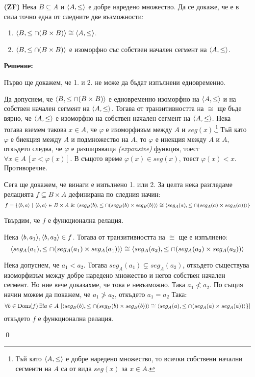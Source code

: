 \begin{problem}
\textbf{(ZF)}
Нека $B \subseteq A$ и $\langle A, \leq \rangle$ е добре наредено множество.
Да се докаже, че е в сила точно една от следните две възможности:
\begin{enumerate}
\item
$\langle B, \leq \cap (B \times B) \rangle \cong \langle A, \leq \rangle$.

\item
$\langle B, \leq \cap (B \times B) \rangle$ е изоморфно със собствен начален сегмент на $\langle A, \leq \rangle$.
\end{enumerate}
\end{problem}

\textbf{Решение:}

\smallbreak
\quad
Първо ще докажем, че 1. и 2. не може да бъдат изпълнени едновременно.

\begin{tcolorbox}[mybox={Доказателство:}]
\quad
Да допуснем, че $\langle B, \leq \cap (B \times B) \rangle$ е едновременно изоморфно на $\langle A, \leq \rangle$
и на собствен начален сегмент на $\langle A, \leq \rangle$.
Тогава от транзитивността на $\cong$ ще бъде вярно, че
$\langle A, \leq \rangle$ е изоморфно на собствен начален сегмент на $\langle A, \leq \rangle$.
Нека тогава вземем такова $x \in A$, че $\varphi$ е изоморфизъм между $A$ и $seg(x)$.\footnote{Тъй като $\langle A, \leq \rangle$
е добре наредено множество, то всички собствени начални сегменти на $A$ са от вида $seg(x)$ за $x \in A$.}
Тъй като $\varphi$ е биекция между $A$ и подмножество на $A$, то
$\varphi$ е инекция между $A$ и $A$, откъдето следва, че $\varphi$ е разширяваща \textit{(expansive)} функция,
тоест $\forall x \in A\ [x < \varphi(x)]$. В същото време $\varphi(x) \in seg(x)$, тоест $\varphi(x) < x$. Противоречие.
\end{tcolorbox}

\quad
Сега ще докажем, че винаги е изпълнено 1. или 2.
За целта нека разгледаме релацията $f \subseteq B \times A$ дефинирана по следния начин:
\[
f = \{\langle b, a \rangle\ |\ \langle b, a \rangle \in B \times A \ \&\ 
                      \langle seg_B(b), \leq \cap (seg_B(b) \times seg_B(b)) \rangle \cong \langle seg_A(a), \leq \cap (seg_A(a) \times seg_A(a)) \rangle\}
\]

\quad
Твърдим, че $f$ е функционална релация.
\begin{tcolorbox}[mybox={Доказателство:}]
\quad
Нека $\langle b, a_1 \rangle, \langle b, a_2 \rangle \in f$.
Тогава от транзитивността на $\cong$ ще е изпълнено:
\[\langle seg_A(a_1), \leq \cap (seg_A(a_1) \times seg_A(a_1)) \rangle \cong \langle seg_A(a_2), \leq \cap (seg_A(a_2) \times seg_A(a_2)) \rangle\]

\quad
Нека допуснем, че $a_1 < a_2$.
Тогава $seg_A(a_1) \subsetneq seg_A(a_2)$, откъдето съществува изоморфизъм
между добре наредено множество и негов собствен начален сегмент.
Но ние вече доказахме, че това е невъзможно.
Така $a_1 \not < a_2$.
По същия начин можем да покажем, че $a_1 \not > a_2$, откъдето $a_1 = a_2$
Така:
\[
\forall b \in \operatorname{Dom}(f) \, \exists! a \in A
\ [
\langle seg_B(b), \leq \cap (seg_B(b) \times seg_B(b)) \rangle \cong \langle seg_A(a), \leq \cap (seg_A(a) \times seg_A(a)) \rangle\}
]
\]
\quad
откъдето $f$ е функционална релация.

\qed
\end{tcolorbox}


